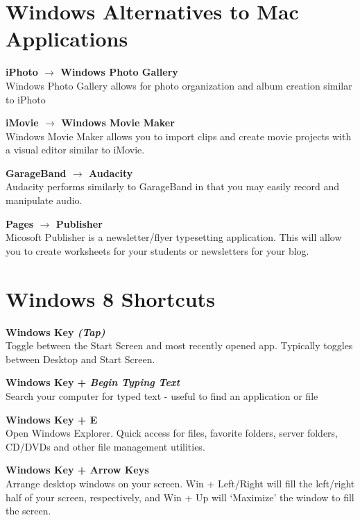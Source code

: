 \documentclass[10pt,foldmark,notumble]{leaflet}
\begin{document}

\section{Windows Alternatives to Mac Applications\color{red}\hrulefill\color{black}}
\textbf{iPhoto $\to$ Windows Photo Gallery}\\
Windows Photo Gallery allows for photo organization and album creation similar to iPhoto

\textbf{iMovie $\to$ Windows Movie Maker}\\
Windows Movie Maker allows you to import clips and create movie projects with a visual editor similar to iMovie.

\textbf{GarageBand $\to$ Audacity}\\
Audacity performs similarly to GarageBand in that you may easily record and manipulate audio.

\textbf{Pages $\to$ Publisher}\\
Micosoft Publisher is a newsletter/flyer typesetting application. This will allow you to create worksheets for your students or newsletters for your blog.

\section{Windows 8 Shortcuts\color{red}\hrulefill\color{black}}
\textbf{Windows Key \emph{(Tap)}}\\
Toggle between the Start Screen and most recently opened app. Typically toggles between Desktop and Start Screen.

\textbf{Windows Key + \emph{Begin Typing Text}}\\
Search your computer for typed text - useful to find an application or file

\textbf{Windows Key + E}\\
Open Windows Explorer. Quick access for files, favorite folders, server folders, CD/DVDs and other file management utilities.

\textbf{Windows Key + Arrow Keys}\\
Arrange desktop windows on your screen. Win + Left/Right will fill the left/right half of your screen, respectively, and Win + Up will `Maximize' the window to fill the screen.
\end{document}
